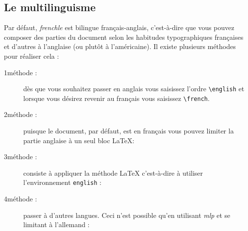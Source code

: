 \documentclass[a4paper,12pt,openright]{article}
\begin{document}
\subsection{Le multilinguisme}\label{multilin}\label{multilingue}
Par défaut, \textit{frenchle} est bilingue français-anglais, c’est-à-dire que vous pouvez
composer des parties du document selon les habitudes typographiques
françaises et d’autres à l’anglaise (ou plutôt à l’américaine). Il existe plusieurs
méthodes pour réaliser cela :
\begin{description}
\item[1\iere méthode :] dès que vous souhaitez passer en anglais vous saisissez l’ordre
\verb|\english| et lorsque vous désirez revenir au français vous 
saisissez \verb|\french|.
\begin{center}
\end{center}
\item[2\ieme méthode :] puisque le document, par défaut, est en français vous pouvez
limiter la partie anglaise à un seul bloc \LaTeX{}:
\begin{center}
\end{center}
\item[3\ieme méthode :] consiste à appliquer la méthode \LaTeX{} c’est-à-dire à utiliser
l’environnement \texttt{english} :
\begin{center}
\end{center}
\item[4\ieme méthode :] passer à d'autres langues. 
Ceci n'est possible qu'en utilisant \textsl{mlp}\label{meth4}
et se limitant à l'allemand   :
\begin{center}
\fbox{
\begin{minipage}{80mm}
\texttt{\backslash{}documentclass[german, frenchle, ...}\\

\end{minipage}}
\end{center}
\end{description}
\end{document}
